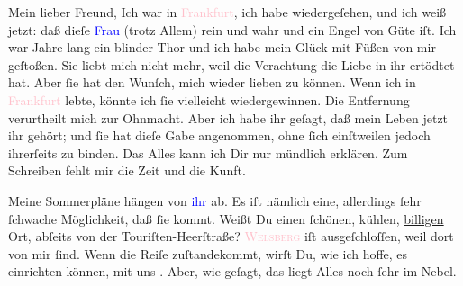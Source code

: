 \pstart\center{}Mein lieber Freund,\pend
\pstart
           Ich war in \textcolor{pink}{Frankfurt}{}\ledrightnote{\textcolor{pink}{Frankfurt am Main}}, ich habe \label{K_L03377-1v}\label{K_L03377-1h}
               wiedergeſehen, und ich weiß jetzt: daß dieſe \textcolor{blue}{Frau}{}\ledrightnote{{$\rightarrow$}\textcolor{blue}{Theodore Rottenberg}} (trotz Allem) rein und wahr und ein Engel von Güte iſt.
               Ich war Jahre lang ein blinder Thor und ich habe mein Glück mit Füßen von mir
               geſtoßen. Sie liebt mich nicht mehr, weil die Verachtung die Liebe in ihr ertödtet
               hat. Aber ſie hat den Wunſch, mich wieder lieben zu können. Wenn ich in \textcolor{pink}{Frankfurt}{}\ledrightnote{\textcolor{pink}{Frankfurt am Main}} lebte, könnte ich ſie vielleicht
               wiedergewinnen. Die Entfernung verurtheilt mich zur Ohnmacht. Aber ich habe  ihr geſagt, daß mein Leben jetzt ihr gehört; und
               ſie hat dieſe Gabe angenommen, ohne ſich einſtweilen jedoch ihrerſeits zu {\pb}binden. Das Alles kann ich Dir nur mündlich
               erklären. Zum Schreiben fehlt mir die Zeit und die Kunft.\pend
           
\pstart
           Meine Sommerpläne hängen von \textcolor{blue}{ihr}{}\ledrightnote{{$\rightarrow$}\textcolor{blue}{Theodore Rottenberg}} ab. Es iſt nämlich eine, allerdings ſehr ſchwache Möglichkeit, daß ſie
                  \label{K_L03377-2v}\label{K_L03377-2h} kommt. Weißt Du einen ſchönen, kühlen, \uline{billigen} Ort, abſeits von der Touriſten-Heerſtraße? \textsc{\textcolor{pink}{Welsberg}{}\ledrightnote{\textcolor{pink}{Welsberg-Taisten}}} iſt ausgeſchloſſen, weil dort \label{K_L03377-3v}\label{K_L03377-3h} von mir
               ſind. Wenn die Reiſe zuſtandekommt, wirſt Du, wie ich hoffe, es einrichten können,
               mit uns \label{K_L03377-4v}\label{K_L03377-4h}. Aber, wie geſagt, das liegt Alles noch ſehr im Nebel.\pend
           
